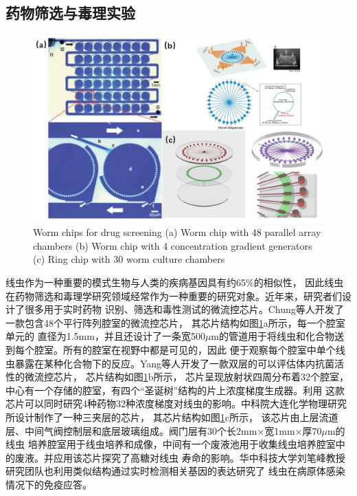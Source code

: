 \subsection{药物筛选与毒理实验}
\label{sec:intro:analog}
	\begin{figure}[!h]
	  \centering
	  \includegraphics[width=12cm]{figure/chap1/screen.jpg}
		{Worm chips for drug screening
		(a) Worm chip with 48 parallel array chambers\cite{Chung2011Microfluidic}
		(b) Worm chip with 4 concentration gradient generators\cite{Yang2013An}
		(c) Ring chip with 30 worm culture chambers\cite{zhuliguo2016}
		}
	  \label{fig:screening}
	\end{figure}
	线虫作为一种重要的模式生物与人类的疾病基因具有约65\%的相似性\cite{Baumeister2002The,Sonnhammer1997Analysis}，
	因此线虫在药物筛选和毒理学研究领域经常作为一种重要的研究对象。近年来，研究者们设计了很多用于实时药物
	识别、筛选和毒性测试的微流控芯片。Chung等人\cite{Chung2011Microfluidic}开发了一款包含48个平行阵列腔室的微流控芯片，
	其芯片结构如图\ref{fig:screening}a所示，每一个腔室单元的
	直径为1.5mm，并且还设计了一条宽500$\mu$m的管道用于将线虫和化合物送到每个腔室。所有的腔室在视野中都是可见的，因此
	便于观察每个腔室中单个线虫暴露在某种化合物下的反应。Yang等人\cite{Yang2013An}开发了一款双层的可以评估体内抗菌活性的微流控芯片，
	芯片结构如图\ref{fig:screening}b所示，
	芯片呈现放射状四周分布着32个腔室，中心有一个存储的腔室，有四个“圣诞树”结构的片上浓度梯度生成器\cite{Dertinger2001Generation,Jeon2000Generation}。利用
	这款芯片可以同时研究4种药物32种浓度梯度对线虫的影响。中科院大连化学物理研究所设计制作了一种三夹层的芯片，
	其芯片结构如图\ref{fig:screening}c所示，
	该芯片由上层流道层、中间气阀控制层和底层玻璃组成。阀门层有30个长2mm$\times$宽1mm$\times$厚70$\mu$m的线虫
	培养腔室用于线虫培养和成像，中间有一个废液池用于收集线虫培养腔室中的废液。并应用该芯片探究了高糖对线虫
	寿命的影响\cite{zhuliguo2016}。华中科技大学刘笔峰教授研究团队也利用类似结构通过实时检测相关基因的表达研究了
	线虫在病原体感染情况下的免疫应答\cite{hu2018real}。

